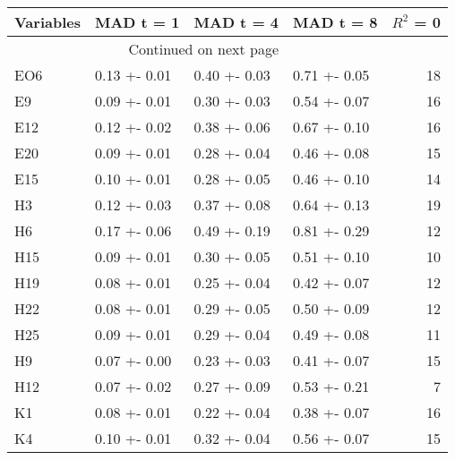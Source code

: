 \begin{longtable}{llllr}
\toprule
\textbf{Variables} & \textbf{MAD t = 1} & \textbf{MAD t = 4} & \textbf{MAD t = 8} &  \textbf{$R^2$ = 0} \\
\midrule
\endhead
\midrule
\multicolumn{3}{r}{{Continued on next page}} \\
\midrule
\endfoot

\bottomrule
\endlastfoot
               EO6 &       0.13 +- 0.01 &       0.40 +- 0.03 &       0.71 +- 0.05 &                  18 \\
                E9 &       0.09 +- 0.01 &       0.30 +- 0.03 &       0.54 +- 0.07 &                  16 \\
               E12 &       0.12 +- 0.02 &       0.38 +- 0.06 &       0.67 +- 0.10 &                  16 \\
               E20 &       0.09 +- 0.01 &       0.28 +- 0.04 &       0.46 +- 0.08 &                  15 \\
               E15 &       0.10 +- 0.01 &       0.28 +- 0.05 &       0.46 +- 0.10 &                  14 \\
                H3 &       0.12 +- 0.03 &       0.37 +- 0.08 &       0.64 +- 0.13 &                  19 \\
                H6 &       0.17 +- 0.06 &       0.49 +- 0.19 &       0.81 +- 0.29 &                  12 \\
               H15 &       0.09 +- 0.01 &       0.30 +- 0.05 &       0.51 +- 0.10 &                  10 \\
               H19 &       0.08 +- 0.01 &       0.25 +- 0.04 &       0.42 +- 0.07 &                  12 \\
               H22 &       0.08 +- 0.01 &       0.29 +- 0.05 &       0.50 +- 0.09 &                  12 \\
               H25 &       0.09 +- 0.01 &       0.29 +- 0.04 &       0.49 +- 0.08 &                  11 \\
                H9 &       0.07 +- 0.00 &       0.23 +- 0.03 &       0.41 +- 0.07 &                  15 \\
               H12 &       0.07 +- 0.02 &       0.27 +- 0.09 &       0.53 +- 0.21 &                   7 \\
                K1 &       0.08 +- 0.01 &       0.22 +- 0.04 &       0.38 +- 0.07 &                  16 \\
                K4 &       0.10 +- 0.01 &       0.32 +- 0.04 &       0.56 +- 0.07 &                  15 \\

\end{longtable}
